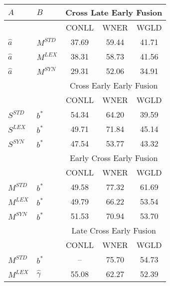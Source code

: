 \begin{tabular}{@{}llccc@{}}
	\toprule
	$A$                      & $B$            & \multicolumn{3}{c}{Cross Late Early Fusion}  \\ \midrule
	                         &                & CONLL & WNER  &             WGLD             \\
	\cmidrule{3-5}
$\hat{a}$ & $M^{STD}$      & 37.69 & 59.44 &            41.71             \\
	$\hat{a}$                & $M^{LEX}$      & 38.31 & 58.73 &            41.56             \\
	$\hat{a}$                & $M^{SYN}$      & 29.31 & 52.06 &            34.91             \\ \midrule
	                         &                & \multicolumn{3}{c}{Cross Early Early Fusion} \\ \midrule
	                         &                & CONLL & WNER  &             WGLD             \\
	\cmidrule{3-5}
$S^{STD}$ & $b^*$          &   54.34    &    64.20   & 39.59 \\
	$S^{LEX}$                & $b^*$          &  49.71     &   71.84    &  45.14\\
	$S^{SYN}$                & $b^*$          &  47.54     &   53.77    & 43.32 \\ \midrule
	                         &                & \multicolumn{3}{c}{Early Cross Early Fusion} \\ \midrule
	                         &                & CONLL & WNER  &             WGLD             \\
	\cmidrule{3-5}
$M^{STD}$ & $b^*$          & 49.58 & 77.32 &            61.69             \\
	$M^{LEX}$                & $b^*$          & 49.79 & 66.22 &            53.54             \\
	$M^{SYN}$                & $b^*$          & 51.53 & 70.94 &            53.70             \\ \midrule
	                         &                & \multicolumn{3}{c}{Late Cross Early Fusion}  \\ \midrule
	                         &                & CONLL & WNER  &             WGLD             \\
	\cmidrule{3-5}
$M^{STD}$ & $b^*$          &  --   & 75.70 &            54.73             \\
	$M^{LEX}$                & $\hat{\gamma}$ & 55.08 & 62.27 &            52.39             \\ \bottomrule
\end{tabular}